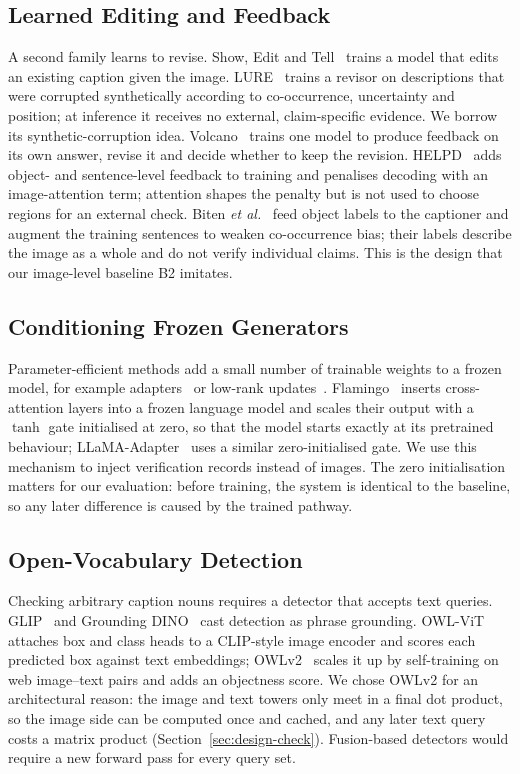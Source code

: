 \subsection{Learned Editing and Feedback}
A second family learns to revise. Show, Edit and Tell~\cite{sammani2020show} trains a model that edits an existing caption given the image. LURE~\cite{zhou2024analyzing} trains a revisor on descriptions that were corrupted synthetically according to co-occurrence, uncertainty and position; at inference it receives no external, claim-specific evidence. We borrow its synthetic-corruption idea. Volcano~\cite{lee2024volcano} trains one model to produce feedback on its own answer, revise it and decide whether to keep the revision. HELPD~\cite{yuan2024helpd} adds object- and sentence-level feedback to training and penalises decoding with an image-attention term; attention shapes the penalty but is not used to choose regions for an external check. Biten \emph{et al.}~\cite{biten2022let} feed object labels to the captioner and augment the training sentences to weaken co-occurrence bias; their labels describe the image as a whole and do not verify individual claims. This is the design that our image-level baseline B2 imitates.

\subsection{Conditioning Frozen Generators}
Parameter-efficient methods add a small number of trainable weights to a frozen model, for example adapters~\cite{houlsby2019parameter} or low-rank updates~\cite{hu2022lora}. Flamingo~\cite{alayrac2022flamingo} inserts cross-attention layers into a frozen language model and scales their output with a $\tanh$ gate initialised at zero, so that the model starts exactly at its pretrained behaviour; LLaMA-Adapter~\cite{zhang2024llama} uses a similar zero-initialised gate. We use this mechanism to inject verification records instead of images. The zero initialisation matters for our evaluation: before training, the system is identical to the baseline, so any later difference is caused by the trained pathway.

\subsection{Open-Vocabulary Detection}
Checking arbitrary caption nouns requires a detector that accepts text queries. GLIP~\cite{li2022grounded} and Grounding DINO~\cite{liu2024grounding} cast detection as phrase grounding. OWL-ViT~\cite{minderer2022simple} attaches box and class heads to a CLIP-style image encoder and scores each predicted box against text embeddings; OWLv2~\cite{minderer2023scaling} scales it up by self-training on web image--text pairs and adds an objectness score. We chose OWLv2 for an architectural reason: the image and text towers only meet in a final dot product, so the image side can be computed once and cached, and any later text query costs a matrix product (Section~\ref{sec:design-check}). Fusion-based detectors would require a new forward pass for every query set.

